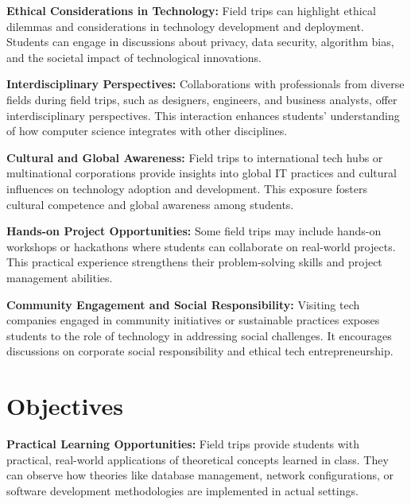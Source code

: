 \documentclass[a4paper,12pt]{report}
\begin{document}
	\vspace{\baselineskip}
	
	\textbf{Ethical Considerations in Technology:} Field trips can highlight ethical dilemmas and considerations in technology development and deployment. Students can engage in discussions about privacy, data security, algorithm bias, and the societal impact of technological innovations.
	
	\vspace{\baselineskip}
	
	\textbf{Interdisciplinary Perspectives:} Collaborations with professionals from diverse fields during field trips, such as designers, engineers, and business analysts, offer interdisciplinary perspectives. This interaction enhances students' understanding of how computer science integrates with other disciplines.
	
	\vspace{\baselineskip}
	
	\textbf{Cultural and Global Awareness:} Field trips to international tech hubs or multinational corporations provide insights into global IT practices and cultural influences on technology adoption and development. This exposure fosters cultural competence and global awareness among students.
	
	\vspace{\baselineskip}
	
	\textbf{Hands-on Project Opportunities:} Some field trips may include hands-on workshops or hackathons where students can collaborate on real-world projects. This practical experience strengthens their problem-solving skills and project management abilities.
	
	\vspace{\baselineskip}
	
	\textbf{Community Engagement and Social Responsibility:} Visiting tech companies engaged in community initiatives or sustainable practices exposes students to the role of technology in addressing social challenges. It encourages discussions on corporate social responsibility and ethical tech entrepreneurship.
	
	\section{Objectives}
	
	\textbf{Practical Learning Opportunities:} Field trips provide students with practical, real-world applications of theoretical concepts learned in class. They can observe how theories like database management, network configurations, or software development methodologies are implemented in actual settings.
	
\end{document}

